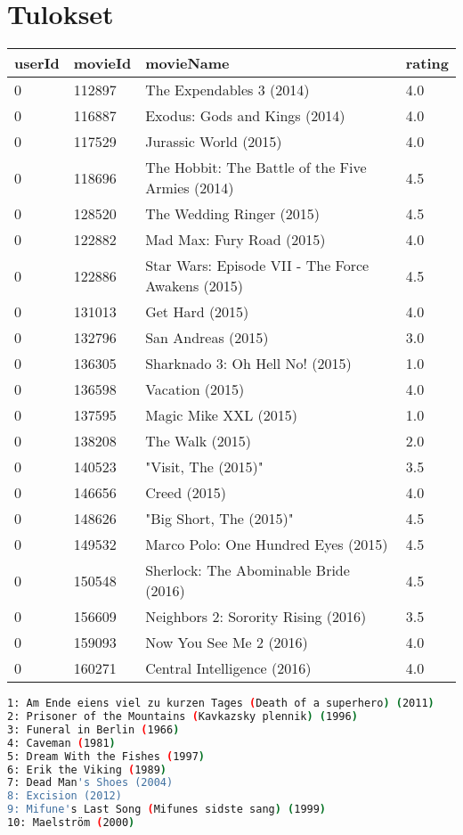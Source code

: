 \documentclass[main.tex]{thesis.tex}
\begin{document}
\chapter{Tulokset}

\begin{tabular}{llll}
	userId & movieId & movieName & rating \\ \hline
	0 & 112897 & The Expendables 3 (2014) & 4.0 \\
	0 & 116887 & Exodus: Gods and Kings (2014) & 4.0 \\
	0 & 117529 & Jurassic World (2015) & 4.0 \\
	0 & 118696 & The Hobbit: The Battle of the Five Armies (2014) & 4.5 \\
	0 & 128520 & The Wedding Ringer (2015) & 4.5 \\
	0 & 122882 & Mad Max: Fury Road (2015) & 4.0 \\
	0 & 122886 & Star Wars: Episode VII - The Force Awakens (2015) & 4.5 \\
	0 & 131013 & Get Hard (2015) & 4.0 \\
	0 & 132796 & San Andreas (2015) & 3.0 \\
	0 & 136305 & Sharknado 3: Oh Hell No! (2015) & 1.0 \\
	0 & 136598 & Vacation (2015) & 4.0 \\
	0 & 137595 & Magic Mike XXL (2015) & 1.0 \\
	0 & 138208 & The Walk (2015) & 2.0 \\
	0 & 140523 & "Visit, The (2015)" & 3.5 \\
	0 & 146656 & Creed (2015) & 4.0 \\
	0 & 148626 & "Big Short, The (2015)" & 4.5 \\
	0 & 149532 & Marco Polo: One Hundred Eyes (2015) & 4.5 \\
	0 & 150548 & Sherlock: The Abominable Bride (2016) & 4.5 \\
	0 & 156609 & Neighbors 2: Sorority Rising (2016) & 3.5 \\
	0 & 159093 & Now You See Me 2 (2016) & 4.0 \\
	0 & 160271 & Central Intelligence (2016) & 4.0 \\
\end{tabular}

\begin{lstlisting}[caption=Suositellut elokuvat, language=sh]
1: Am Ende eiens viel zu kurzen Tages (Death of a superhero) (2011)
2: Prisoner of the Mountains (Kavkazsky plennik) (1996)
3: Funeral in Berlin (1966)
4: Caveman (1981)
5: Dream With the Fishes (1997)
6: Erik the Viking (1989)
7: Dead Man's Shoes (2004)
8: Excision (2012)
9: Mifune's Last Song (Mifunes sidste sang) (1999)
10: Maelström (2000)
\end{lstlisting}
\end{document}
